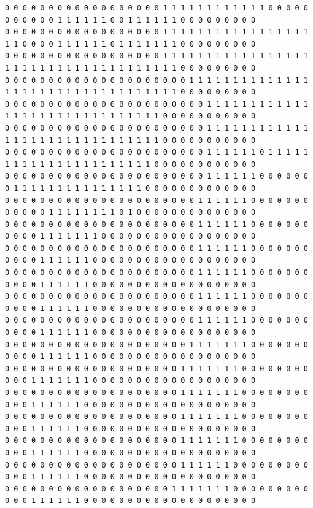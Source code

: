 \documentclass{oci}
\begin{document}
\begin{sampleDescription}
{\begin{verbatim}
0 0 0 0 0 0 0 0 0 0 0 0 0 0 0 0 0 0 1 1 1 1 1 1 1 1 1 1 1 1 0 0 0 0 0 0 0 0 0 0 0 1 1 1 1 1 1 0 0 1 1 1 1 1 1 0 0 0 0 0 0 0 0 0
0 0 0 0 0 0 0 0 0 0 0 0 0 0 0 0 0 0 1 1 1 1 1 1 1 1 1 1 1 1 1 1 1 1 1 1 1 0 0 0 0 1 1 1 1 1 1 0 1 1 1 1 1 1 1 0 0 0 0 0 0 0 0 0
0 0 0 0 0 0 0 0 0 0 0 0 0 0 0 0 0 0 1 1 1 1 1 1 1 1 1 1 1 1 1 1 1 1 1 1 1 1 1 1 1 1 1 1 1 1 1 1 1 1 1 1 1 1 1 0 0 0 0 0 0 0 0 0
0 0 0 0 0 0 0 0 0 0 0 0 0 0 0 0 0 0 0 0 0 1 1 1 1 1 1 1 1 1 1 1 1 1 1 1 1 1 1 1 1 1 1 1 1 1 1 1 1 1 1 1 1 1 1 0 0 0 0 0 0 0 0 0
0 0 0 0 0 0 0 0 0 0 0 0 0 0 0 0 0 0 0 0 0 0 0 1 1 1 1 1 1 1 1 1 1 1 1 1 1 1 1 1 1 1 1 1 1 1 1 1 1 1 1 1 1 0 0 0 0 0 0 0 0 0 0 0
0 0 0 0 0 0 0 0 0 0 0 0 0 0 0 0 0 0 0 0 0 0 0 1 1 1 1 1 1 1 1 1 1 1 1 1 1 1 1 1 1 1 1 1 1 1 1 1 1 1 1 1 1 0 0 0 0 0 0 0 0 0 0 0
0 0 0 0 0 0 0 0 0 0 0 0 0 0 0 0 0 0 0 0 0 0 0 1 1 1 1 1 1 0 1 1 1 1 1 1 1 1 1 1 1 1 1 1 1 1 1 1 1 1 1 1 0 0 0 0 0 0 0 0 0 0 0 0
0 0 0 0 0 0 0 0 0 0 0 0 0 0 0 0 0 0 0 0 0 0 0 1 1 1 1 1 1 0 0 0 0 0 0 0 1 1 1 1 1 1 1 1 1 1 1 1 1 1 1 0 0 0 0 0 0 0 0 0 0 0 0 0
0 0 0 0 0 0 0 0 0 0 0 0 0 0 0 0 0 0 0 0 0 0 1 1 1 1 1 1 0 0 0 0 0 0 0 0 0 0 0 0 1 1 1 1 1 1 1 1 0 1 0 0 0 0 0 0 0 0 0 0 0 0 0 0
0 0 0 0 0 0 0 0 0 0 0 0 0 0 0 0 0 0 0 0 0 0 1 1 1 1 1 1 0 0 0 0 0 0 0 0 0 0 0 1 1 1 1 1 1 1 0 0 0 0 0 0 0 0 0 0 0 0 0 0 0 0 0 0
0 0 0 0 0 0 0 0 0 0 0 0 0 0 0 0 0 0 0 0 0 0 1 1 1 1 1 1 0 0 0 0 0 0 0 0 0 0 0 1 1 1 1 1 1 0 0 0 0 0 0 0 0 0 0 0 0 0 0 0 0 0 0 0
0 0 0 0 0 0 0 0 0 0 0 0 0 0 0 0 0 0 0 0 0 0 1 1 1 1 1 1 0 0 0 0 0 0 0 0 0 0 0 1 1 1 1 1 1 0 0 0 0 0 0 0 0 0 0 0 0 0 0 0 0 0 0 0
0 0 0 0 0 0 0 0 0 0 0 0 0 0 0 0 0 0 0 0 0 0 1 1 1 1 1 1 0 0 0 0 0 0 0 0 0 0 0 1 1 1 1 1 1 0 0 0 0 0 0 0 0 0 0 0 0 0 0 0 0 0 0 0
0 0 0 0 0 0 0 0 0 0 0 0 0 0 0 0 0 0 0 0 0 0 1 1 1 1 1 1 0 0 0 0 0 0 0 0 0 0 0 1 1 1 1 1 1 0 0 0 0 0 0 0 0 0 0 0 0 0 0 0 0 0 0 0
0 0 0 0 0 0 0 0 0 0 0 0 0 0 0 0 0 0 0 0 0 1 1 1 1 1 1 1 0 0 0 0 0 0 0 0 0 0 0 1 1 1 1 1 1 0 0 0 0 0 0 0 0 0 0 0 0 0 0 0 0 0 0 0
0 0 0 0 0 0 0 0 0 0 0 0 0 0 0 0 0 0 0 0 1 1 1 1 1 1 1 0 0 0 0 0 0 0 0 0 0 0 1 1 1 1 1 1 1 0 0 0 0 0 0 0 0 0 0 0 0 0 0 0 0 0 0 0
0 0 0 0 0 0 0 0 0 0 0 0 0 0 0 0 0 0 0 0 1 1 1 1 1 1 1 0 0 0 0 0 0 0 0 0 0 0 1 1 1 1 1 1 0 0 0 0 0 0 0 0 0 0 0 0 0 0 0 0 0 0 0 0
0 0 0 0 0 0 0 0 0 0 0 0 0 0 0 0 0 0 0 0 1 1 1 1 1 1 1 0 0 0 0 0 0 0 0 0 0 0 1 1 1 1 1 1 0 0 0 0 0 0 0 0 0 0 0 0 0 0 0 0 0 0 0 0
0 0 0 0 0 0 0 0 0 0 0 0 0 0 0 0 0 0 0 0 1 1 1 1 1 1 1 0 0 0 0 0 0 0 0 0 0 0 1 1 1 1 1 1 0 0 0 0 0 0 0 0 0 0 0 0 0 0 0 0 0 0 0 0
0 0 0 0 0 0 0 0 0 0 0 0 0 0 0 0 0 0 0 0 1 1 1 1 1 1 0 0 0 0 0 0 0 0 0 0 0 0 1 1 1 1 1 1 0 0 0 0 0 0 0 0 0 0 0 0 0 0 0 0 0 0 0 0
0 0 0 0 0 0 0 0 0 0 0 0 0 0 0 0 0 0 0 1 1 1 1 1 1 1 0 0 0 0 0 0 0 0 0 0 0 0 1 1 1 1 1 1 0 0 0 0 0 0 0 0 0 0 0 0 0 0 0 0 0 0 0 0

\end{verbatim}}
\end{sampleDescription}
\end{document}
